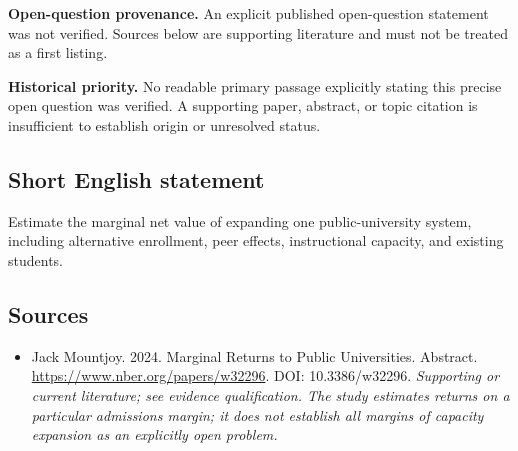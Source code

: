 \documentclass[11pt]{article}
\begin{document}
\par\textbf{Open-question provenance.} An explicit published open-question statement was not verified. Sources below are supporting literature and must not be treated as a first listing.

\par\textbf{Historical priority.} No readable primary passage explicitly stating this precise open question was verified. A supporting paper, abstract, or topic citation is insufficient to establish origin or unresolved status.

\subsection{Short English statement}
Estimate the marginal net value of expanding one public-university system, including alternative enrollment, peer effects, instructional capacity, and existing students.

\subsection{Sources}
\begin{itemize}\raggedright
\item[\textnormal{[S1]}]\hypertarget{source:30007736:1}{} Jack Mountjoy. 2024. Marginal Returns to Public Universities. Abstract.
\url{https://www.nber.org/papers/w32296}.
DOI: 10.3386/w32296.
{\small\textit{Supporting or current literature; see evidence qualification. The study estimates returns on a particular admissions margin; it does not establish all margins of capacity expansion as an explicitly open problem.}}
\end{itemize}
\end{document}
